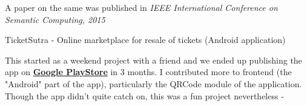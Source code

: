 \begin{cventries}
{\begin{cvitems}
        \item {A paper on the same was published in \textit{IEEE International Conference on Semantic Computing, 2015} }
      \end{cvitems}
    }
  \majprojentry
    {TicketSutra - Online marketplace for resale of tickets (Android application)}
    {
      \begin{cvitems} %
        \item {This started as a weekend project with a friend and we ended up publishing the app on \textbf{\href{https://play.google.com/store/apps/details?id=com.resale.ticketSutra&hl=en}{ Google PlayStore}} in 3 months. I  contributed more to  frontend (the "Android" part of the app), particularly the QRCode module of the application. Though the app didn't quite catch on, this was a fun project nevertheless \enspace - }
      \end{cvitems}
    }
    

\end{cventries}

